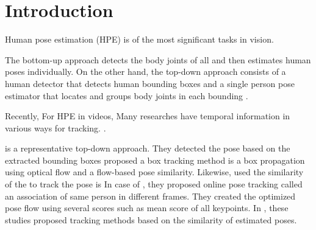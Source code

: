 \documentclass[conference]{IEEEtran}
\begin{document}
\section{Introduction}

Human pose estimation (HPE) is  of the most significant tasks in   vision.


The bottom-up approach \cite{cao2017realtime, doering2018joint, insafutdinov2016deepercut, Iqbal_CVPR2017, jin2017towards, fractalnet, deepcut16cvpr, MPR, DBLP:conf/cvpr/XiaWCY17, Zhu2017} detects the body joints of all   and then estimates human poses individually. 
On the other hand, the top-down approach \cite{fang2017rmpe, girdhar2018detecttrack, DBLP:conf/nips/NewellHD17, jin2017towards, George2017, xiao2018simple, xiu2018pose} consists of a human detector that detects human bounding boxes and a single person pose estimator that locates and groups body joints in each bounding . 


Recently,  For HPE in videos,   Many researches have  temporal information in various ways for tracking. 
 \cite{xiao2018simple, MPR, xiu2018pose, doering2018joint}.


 \cite{xiao2018simple} is a representative top-down approach. They detected the pose based on the extracted bounding  boxes  proposed a box tracking method   is  a box propagation using optical flow and a flow-based pose similarity. 
Likewise,  \cite{MPR} used the similarity of the  to track the pose   is  
In case of \cite{xiu2018pose}, they proposed  online pose tracking  called  an association of  same person in different frames. They created the optimized pose flow using several scores such as mean score of all keypoints. 
In , these studies proposed tracking methods based on the similarity of estimated poses.  
\end{document}
